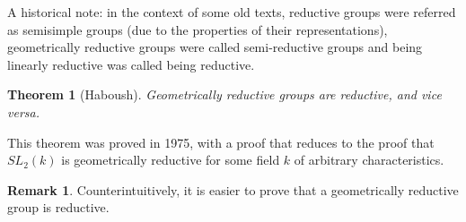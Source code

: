 \documentclass[12pt]{article}
\newtheorem{theorem}{Theorem}[section]
\newtheorem{lemma}{Lemma}[section]
\theoremstyle{remark}
\theoremstyle{definition}
\newtheorem{remark}{Remark}[section]
\newcommand{\comment}[1]{}
\begin{document}
    A historical note: in the context of some old texts, reductive groups were referred as semisimple groups (due to the properties of their representations), geometrically reductive groups were called semi-reductive groups and being linearly reductive was called being reductive.
    \begin{theorem}[Haboush]
        Geometrically reductive groups are reductive, and vice versa.
    \end{theorem}
    This theorem was proved in 1975, with a proof that reduces to the proof that $SL_2(k)$ is geometrically reductive for some field $k$ of arbitrary characteristics.
    \begin{remark}
        Counterintuitively, it is easier to prove that a geometrically reductive group is reductive.
    \end{remark}
    \comment{
    We will show that, for fields of characteristics zero,
    \begin{theorem}[characteristics zero]
        A geometrically reductive group is reductive, and vice versa.
    \end{theorem}
    \begin{proof}
        We will assume that an algebraic group is reductive if and only if it's reductive in characteristic zero (\textcolor{blue}{reference here; Milne 22.138}). We will outline Nagata's proof of the lemma.

        We first quote a lemma
        \begin{lemma}
            Let $G$ be a connected linear algebraic group and let $H$ be a subgroup of $G$. Then if $G/H$ is affine, $G/R_u(H)$ is affine and furthermore for a rational representation $\rho$ of the form 
            \[\begin{bmatrix}
                1 & \tau\\
                0 & \rho'
            \end{bmatrix},\] 
            and there is a rational representation $\rho^*$ of $G$ such that
            \[\rho^*=\begin{bmatrix}
                1 & \tau^* & \tau_1^*\\
                0 & \rho^{'*} & \tau_2^*\\
                0 & \tau'^* & \rho_2^*
            \end{bmatrix},\quad \rho^*|_{H_u}=\begin{bmatrix}
                1 & \tau & *\\
                0 & \rho' & *\\
                0 & 0 & *
            \end{bmatrix}\]
        \end{lemma}
    \end{proof}}
\end{document}

